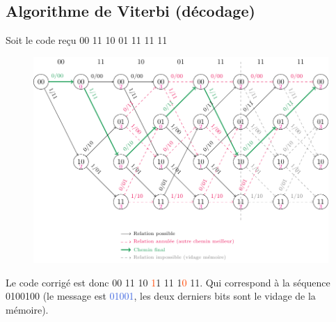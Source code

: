 \documentclass[]{article}
\begin{document}
\begin{multicols}{2}
\section{Algorithme de Viterbi (décodage)}
Soit le code reçu 00 11 10 01 11 11 11
\begin{figure}[H]
\centering
\includegraphics[width=0.9\columnwidth]{Viterbi.pdf}
\end{figure}
Le code corrigé est donc
00 11 10 \textcolor{OrangeRed}{1}1 11 1\textcolor{OrangeRed}{0} 11. Qui correspond à la séquence 0100100 (le message est \textcolor{RoyalBlue}{01001}, les deux derniers bits sont le vidage de la mémoire).
\end{multicols}
\end{document}
